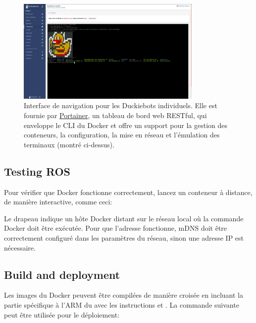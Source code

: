 \begin{figure}
\includegraphics[width=0.80\textwidth]{../figures/portainer_screenshot.png}
\caption{Interface de navigation pour les Duckiebots individuels. Elle est fournie par \href{https://www.portainer.io/}{Portainer}, un tableau de bord web RESTful, qui enveloppe le CLI du Docker et offre un support pour la gestion des conteneurs, la configuration, la mise en réseau et l'émulation des terminaux (montré ci-dessus). }
\label{fig:portainer_ui}
\end{figure}

\subsection{Testing ROS}

\noindent Pour vérifier que Docker fonctionne correctement, lancez un conteneur à distance, de manière interactive, comme ceci:

%
Le drapeau  indique un hôte Docker distant sur le réseau local où la commande Docker doit être exécutée. Pour que l'adresse  fonctionne, mDNS doit être correctement configuré dans les paramètres du réseau, sinon une adresse IP est nécessaire.

\subsection{Build and deployment}

Les images du Docker peuvent être compilées de manière croisée en incluant la partie spécifique à l'ARM du  avec les instructions  et . La commande suivante peut être utilisée pour le déploiement:

